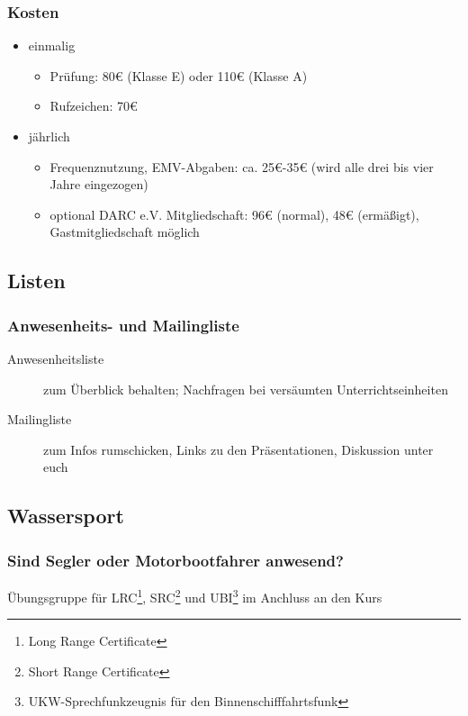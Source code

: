 \begin{frame}
  \frametitle{Kosten}

  \begin{itemize}
    \item einmalig
      \begin{itemize}
        \item Prüfung: 80€ (Klasse E) oder 110€ (Klasse A)
        \item Rufzeichen: 70€
      \end{itemize}
    \item jährlich
      \begin{itemize}
        \item Frequenznutzung, EMV-Abgaben: ca. 25€-35€ (wird alle drei bis vier Jahre eingezogen)
        \item optional DARC e.V. Mitgliedschaft: 96€ (normal), 48€ (ermäßigt), Gastmitgliedschaft möglich
      \end{itemize}
  \end{itemize}
\end{frame}

\subsection{Listen}

\begin{frame}
  \frametitle{Anwesenheits- und Mailingliste}

  \begin{description}
    \item[Anwesenheitsliste] zum Überblick behalten; Nachfragen bei versäumten Unterrichtseinheiten
    \item[Mailingliste] zum Infos rumschicken, Links zu den Präsentationen, Diskussion unter euch
  \end{description}
\end{frame}


\subsection{Wassersport}

\begin{frame}
  \frametitle{Sind Segler oder Motorbootfahrer anwesend?}

  Übungsgruppe für LRC\footnote{Long Range Certificate}, SRC\footnote{Short Range Certificate} und UBI\footnote{UKW-Sprechfunkzeugnis für den Binnenschifffahrtsfunk} im Anchluss an den Kurs
\end{frame}


